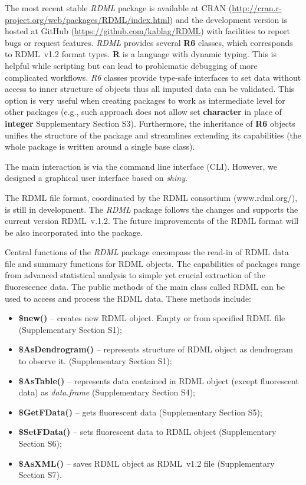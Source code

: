 \documentclass{bioinfo}
\begin{document}
	The most recent stable \textit{RDML} package is available at CRAN
	(\url{http://cran.r-project.org/web/packages/RDML/index.html}) and the
	development version is hosted at GitHub (\url{https://github.com/kablag/RDML})
	with facilities to report bugs or request features. \textit{RDML}
	provides several \textbf{R6} classes, which corresponds to RDML~v1.2 format types.
	\textbf{R} is a language with dynamic typing. This is helpful while scripting but
	can lead to problematic debugging of more complicated workflows. \emph{R6} classes
	provide type-safe interfaces to set data without access to inner structure of
	objects thus all imputed data can be validated. This option is very useful when
	creating packages to work as intermediate level for other packages (e.g., such
	approach does not allow set \textbf{character} in place of \textbf{integer}
	Supplementary Section S3). Furthermore, the inheritance of \textbf{R6} objects 
	unifies the structure of the package and streamlines extending its capabilities 
	(the whole package is written around a single base class).
	
	The main interaction is via the command line interface (CLI). However, 
	we designed a graphical user interface based on \textit{shiny}.
	
	The RDML file format, coordinated by the RDML consortium (www.rdml.org/), is still 
	in development. The \textit{RDML} package follows the changes and supports the 
	current version RDML~v.1.2. The future improvements of the RDML format will be also 
	incorporated into the package.
	
	Central functions of the \textit{RDML} package encompass the read-in of RDML
	data file and summary functions for RDML objects. The capabilities of packages range 
	from advanced statistical analysis to simple yet crucial extraction of the fluorescence 
	data. The public methods of the main class called RDML can be used to access and process 
	the RDML data. These methods include: \begin{itemize} \item
		\textbf{\$new()} -- creates new RDML object. Empty or from specified RDML file
		(Supplementary Section S1); \item \textbf{\$AsDendrogram()} -- represents
		structure of RDML object as dendrogram to observe it. (Supplementary Section
		S1); \item \textbf{\$AsTable()} -- represents data contained in RDML object
		(except fluorescent data) as \textit{data.frame} (Supplementary Section S4);
		\item \textbf{\$GetFData()} -- gets fluorescent data (Supplementary Section S5);
		\item \textbf{\$SetFData()} -- sets fluorescent data to RDML object
		(Supplementary Section S6); \item \textbf{\$AsXML()} -- saves RDML object as
		RDML~v1.2 file (Supplementary Section S7). \end{itemize}
	
\end{document}

